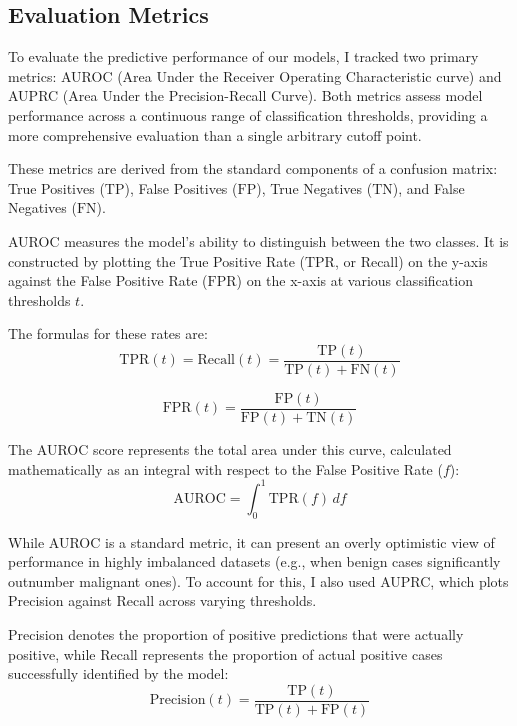 \subsection{Evaluation Metrics}

To evaluate the predictive performance of our models, I tracked two primary metrics: AUROC (Area Under the Receiver Operating Characteristic curve) and AUPRC (Area Under the Precision-Recall Curve). Both metrics assess model performance across a continuous range of classification thresholds, providing a more comprehensive evaluation than a single arbitrary cutoff point.

These metrics are derived from the standard components of a confusion matrix: True Positives ($\mathrm{TP}$), False Positives ($\mathrm{FP}$), True Negatives ($\mathrm{TN}$), and False Negatives ($\mathrm{FN}$).

AUROC measures the model's ability to distinguish between the two classes. It is constructed by plotting the True Positive Rate ($\mathrm{TPR}$, or Recall) on the y-axis against the False Positive Rate ($\mathrm{FPR}$) on the x-axis at various classification thresholds $t$.

The formulas for these rates are:
\begin{equation}
    \mathrm{TPR}(t) = \mathrm{Recall}(t) = \frac{\mathrm{TP}(t)}{\mathrm{TP}(t) + \mathrm{FN}(t)}
\end{equation}

\begin{equation}
    \mathrm{FPR}(t) = \frac{\mathrm{FP}(t)}{\mathrm{FP}(t) + \mathrm{TN}(t)}
\end{equation}

The AUROC score represents the total area under this curve, calculated mathematically as an integral with respect to the False Positive Rate ($f$):
\begin{equation}
    \mathrm{AUROC} = \int_{0}^{1} \mathrm{TPR}(f) \, df
\end{equation}

While AUROC is a standard metric, it can present an overly optimistic view of performance in highly imbalanced datasets (e.g., when benign cases significantly outnumber malignant ones). To account for this, I also used AUPRC, which plots Precision against Recall across varying thresholds.

Precision denotes the proportion of positive predictions that were actually positive, while Recall represents the proportion of actual positive cases successfully identified by the model:
\begin{equation}
    \mathrm{Precision}(t) = \frac{\mathrm{TP}(t)}{\mathrm{TP}(t) + \mathrm{FP}(t)}
\end{equation}

